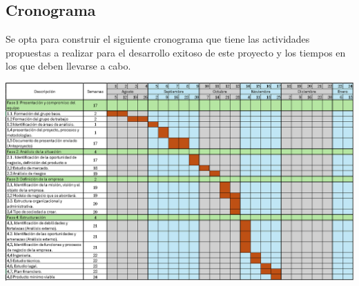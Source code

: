 \subsection{Cronograma}

Se opta para construir el siguiente cronograma que tiene las actividades propuestas a realizar para el desarrollo exitoso de este proyecto y los tiempos en los que deben llevarse a cabo.

\begin{adjustbox}{
    center,
    caption=[{Cronograma de actividades}]{\centering Cronograma de actividades Fuente: Autores},
    label={Cronograma},
    nofloat=figure, vspace={7px}}


    \includegraphics[width=1\textwidth]{Content/Images/cronogramaEmpre.PNG}
\end{adjustbox}



